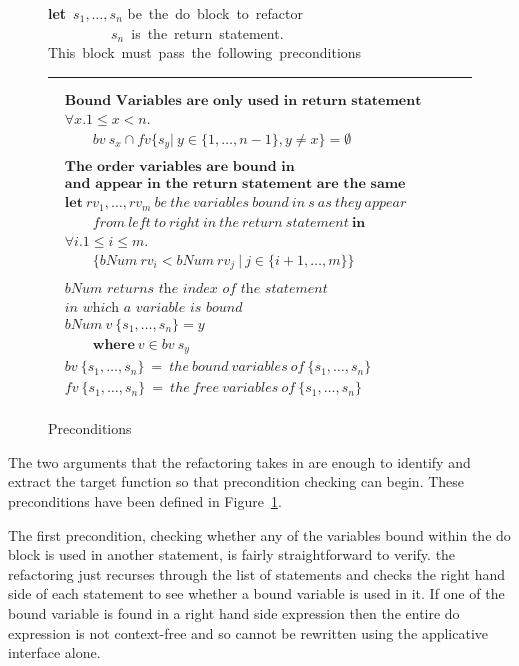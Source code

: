 \begin{figure}[t]
\textbf{let}\ $s_1, \ldots, s_n$ be\ the\ do\ block\ to\ refactor\\
\ ~\ ~\ ~\ ~\       $s_n$\ is\ the\ return\ statement.\\
This\ block\ must\ pass\ the\ following\ preconditions\\
\hrule
\begin{math}
\begin{aligned}  	
&\textbf{Bound Variables are only used in return statement}\\
&\forall x.1\leq x < n.&\\
&\qquad bv\ s_x \cap fv \{s_y |\ y \in \{1, \ldots, n-1\}, y \neq x\} = \emptyset \\
\\
&\textbf{The order variables are bound in}\\
&\textbf{and appear in the return statement are the same}\\
&\textbf{let}\ rv_1, \ldots, rv_m\ be\ the\ variables\ bound\ in\ s\ as\ they\ appear&\\
&\qquad from\ left\ to\ right\ in\ the\ return\ statement\ \textbf{in}&\\
&\forall i. 1 \leq i \leq m .&\\
&\qquad \{bNum\ rv_i < bNum\ rv_j\ |\ j \in \{i+1, \ldots, m\} \}&\\
\\
&\textit{bNum returns the index of the statement}\\ 
&\textit{in which a variable is bound}\\
&bNum\ v\ \{s_1, \ldots, s_n \} = y &\\
&\qquad \textbf{where}\ v \in bv\ s_y&\\ 
&bv\ \{s_1, \ldots, s_n \}\ =\ the\ bound\ variables\ of\ \{s_1, \ldots, s_n\}\\
&fv\ \{s_1, \ldots, s_n \}\ =\ the\ free\ variables\ of\ \{s_1, \ldots, s_n\}\\&
		\end{aligned}
	\end{math}
	\caption{Preconditions}
	\label{preconditions}
\end{figure}

The two arguments that the refactoring takes in are enough to identify and extract the target function so that precondition checking can begin. These preconditions have been defined in Figure~\ref{preconditions}. 

The first precondition, checking whether any of the variables bound within the do block is used in another statement, is fairly straightforward to verify. the refactoring just recurses through the list of statements and checks the right hand side of each statement to see whether a bound variable is used in it. If one of the bound variable is found in a right hand side expression then the entire do expression is not context-free and so cannot be rewritten using the applicative interface alone.

